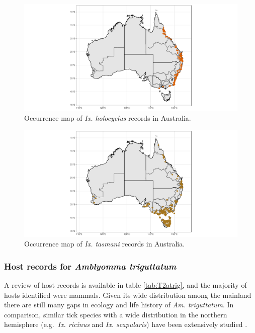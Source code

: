 \documentclass[a4paper, nobind]{templates/ociamthesis}
\begin{document}
\newpage

\begin{figure}
\includegraphics[width=0.95\linewidth]{figures/ms-figs/Ch2-map-ixhol} \caption[Map of \textit{Ix. holocyclus}.]{Occurrence map of \textit{Ix. holocyclus} records in Australia.}\label{fig:F2mapixhol}
\end{figure}

\begin{figure}
\includegraphics[width=0.95\linewidth]{figures/ms-figs/Ch2-map-ixtas} \caption[Map of \textit{Ix. tasmani}.]{Occurrence map of \textit{Ix. tasmani} records in Australia.}\label{fig:F2mapixtas}
\end{figure}

\newpage

\hypertarget{host-records-for-amblyomma-triguttatum}{%
\subsubsection{\texorpdfstring{Host records for \emph{Amblyomma triguttatum}}{Host records for Amblyomma triguttatum}}\label{host-records-for-amblyomma-triguttatum}}

A review of host records is available in table \ref{tab:T2atrig}, and the majority of hosts identified were mammals.
Given its wide distribution among the mainland there are still many gaps in ecology and life history of \emph{Am. triguttatum}.
In comparison, similar tick species with a wide distribution in the northern hemisphere (e.g.~\emph{Ix. ricinus} and \emph{Ix. scapularis}) have been extensively studied \autocite{mihalcaRoleRodentsEcology2013,tietjenComparativeEvaluationNorthern2020}.
\end{document}
